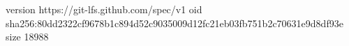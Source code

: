 version https://git-lfs.github.com/spec/v1
oid sha256:80dd2322cf9678b1c894d52c9035009d12fc21eb03fb751b2c70631e9d8df93e
size 18988
